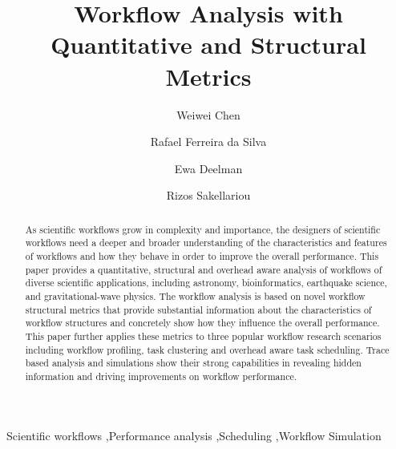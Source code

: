 \documentclass[final,5p,times,twocolumn]{elsarticle}
\begin{document}
\begin{frontmatter}


\title{Workflow Analysis with Quantitative and Structural Metrics}


\author[isi]{Weiwei Chen}

\author[lyon]{Rafael Ferreira da Silva}

\author[isi]{Ewa Deelman}


\author[man]{Rizos Sakellariou}



\address[isi]{University of Southern California, Information Sciences Institute,
		Marina del Rey, CA, USA}
\address[lyon]{University of Lyon, CNRS, Villeurbanne, France}
\address[man]{University of Manchester, School of Computer Science, Manchester, U.K.}


\begin{abstract}
As scientific workflows grow in complexity and importance, the designers of scientific workflows need a deeper and broader understanding of the characteristics and features of workflows and how they behave in order to improve the overall performance. 
This paper provides a quantitative, structural and overhead aware analysis of workflows of diverse scientific applications, including astronomy, bioinformatics, earthquake science, and gravitational-wave physics. The workflow analysis is based on novel workflow structural metrics that provide substantial information about the characteristics of workflow structures and concretely show how they influence the overall performance. 
This paper further applies these metrics to three popular workflow research scenarios including workflow profiling, task clustering and overhead aware task scheduling. Trace based analysis and simulations show their strong capabilities in revealing hidden information and driving improvements on workflow performance. 

\end{abstract}

\begin{keyword}
Scientific workflows \sep Performance analysis \sep Scheduling \sep Workflow Simulation
\end{keyword}

\end{frontmatter}
\end{document}

